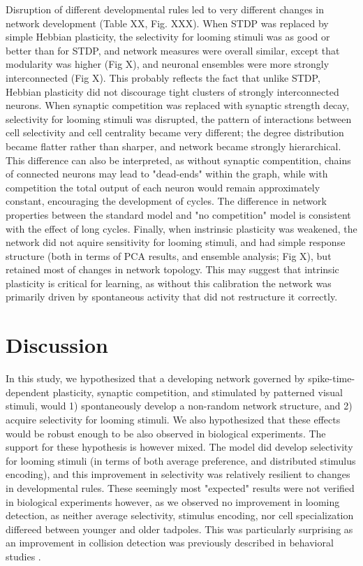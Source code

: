 \documentclass{article}
\begin{document}
Disruption of different developmental rules led to very different changes in network development (Table XX, Fig. XXX). When STDP was replaced by simple Hebbian plasticity, the selectivity for looming stimuli was as good or better than for STDP, and network measures were overall similar, except that modularity was higher (Fig X), and neuronal ensembles were more strongly interconnected (Fig X). This probably reflects the fact that unlike STDP, Hebbian plasticity did not discourage tight clusters of strongly interconnected neurons. When synaptic competition was replaced with synaptic strength decay, selectivity for looming stimuli was disrupted, the pattern of interactions between cell selectivity and cell centrality  became very different; the degree distribution became flatter rather than sharper, and network became strongly hierarchical. This difference can also be interpreted, as without synaptic compentition, chains of connected neurons may lead to "dead-ends" within the graph, while with competition the total output of each neuron would remain approximately constant, encouraging the development of cycles. The difference in network properties between the standard model and "no competition" model is consistent with the effect of long cycles. Finally, when instrinsic plasticity was weakened, the network did not aquire sensitivity for looming stimuli, and had simple response structure (both in terms of PCA results, and ensemble analysis; Fig X), but retained most of changes in network topology. This may suggest that intrinsic plasticity is critical for learning, as without this calibration the network was primarily driven by spontaneous activity that did not restructure it correctly.

\section*{Discussion}

In this study, we hypothesized that a developing network governed by spike-time-dependent plasticity, synaptic competition, and stimulated by patterned visual stimuli, would 1) spontaneously develop a non-random network structure, and 2) acquire selectivity for looming stimuli. We also hypothesized that these effects would be robust enough to be also observed in biological experiments. The support for these hypothesis is however mixed. The model did develop selectivity for looming stimuli (in terms of both average preference, and distributed stimulus encoding), and this improvement in selectivity was relatively resilient to changes in developmental rules. These seemingly most "expected" results were not verified in biological experiments however, as we observed no improvement in looming detection, as neither average selectivity, stimulus encoding, nor cell specialization differeed between younger and older tadpoles. This was particularly surprising as an improvement in collision detection was previously described in behavioral studies \citep{dong2009}.
\end{document}
